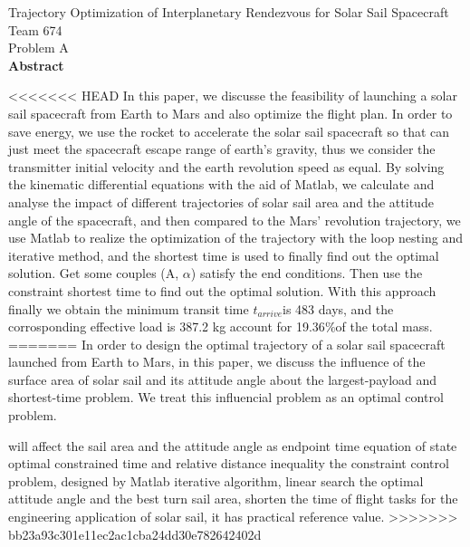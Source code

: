\documentclass[UTF8,a4paper,12pt,twoside]{article}
\begin{document}
 

\begin{titlepage}
	\vspace*{20mm}
	\begin{center}
		{ Trajectory Optimization of Interplanetary Rendezvous for Solar Sail Spacecraft  } \\[10mm]
		{ Team 674 } \\[5mm] %
		{ Problem A } \\[6mm] %
		{\bfseries {} Abstract } \\[3mm]
	\end{center}
<<<<<<< HEAD
	In this paper, we discusse the feasibility of launching a solar sail spacecraft from Earth to Mars and also optimize the flight plan. In order to save energy, we use the rocket to accelerate the solar sail spacecraft so that can just meet the spacecraft escape range of earth's gravity, thus we consider the transmitter initial velocity and the earth revolution speed as equal. By solving the kinematic differential equations with the aid of Matlab, we calculate and analyse the impact of different trajectories of solar sail area and the attitude angle of the spacecraft, and then compared to the Mars' revolution trajectory, we use Matlab to realize the optimization of the trajectory with the loop nesting and iterative method, and the shortest time is used to finally find out the optimal solution. Get some couples (A, $\alpha$) satisfy the end conditions. Then use the constraint shortest time to find out the optimal solution.  With this approach finally we obtain the minimum transit time $t_{arrive}$is 483 days, and the corrosponding effective load is 387.2 kg account for 19.36$\%$of the total mass. 
=======
	In order to design the optimal trajectory of a solar sail spacecraft launched from Earth to Mars, in this paper, we discuss the influence of the surface area of solar sail and its attitude angle about the largest-payload and shortest-time problem. We treat this influencial problem as an optimal control problem.

will affect the sail area and the attitude angle as endpoint time equation of state optimal constrained time and relative distance inequality the constraint control problem, designed by Matlab iterative algorithm, linear search the optimal attitude angle and the best turn sail area, shorten the time of flight tasks for the engineering application of solar sail, it has practical reference value. 
>>>>>>> bb23a93c301e11ec2ac1cba24dd30e782642402d
\end{titlepage}
\end{document}
